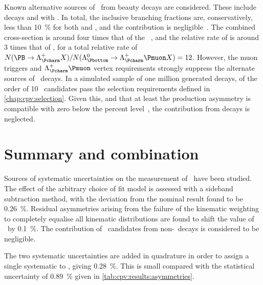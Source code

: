 Known alternative sources of \PLambdac\ from beauty decays are considered.
These include \decay{\PBplus}{\APLambdac\Pproton\Ppiplus} decays and
\decay{\PBplus}{\APSigmac\Pproton\Ppi\Ppi} with 
\decay{\PSigmac}{\PLambdac\Ppi}.
In total, the inclusive  branching fractions are, 
conservatively, less than \SI{10}{\percent} for both \PBplus and \PBzero, and 
the \PBs contribution is negligible~\cite{PDG2014}.
The combined \PB cross-section is around four times that of the 
\PLambdab~\cite{LHCb-PAPER-2013-004,Aaij:2015fea}, and the relative rate of 
 is around 3 times that of \LbToLcmuX, for a total 
relative rate of $N(\decay{\PB}{\PLambdac X})/N(\LbToLcmuX) = 12$.
However, the muon triggers and $\PLambdac\Pmuon$ vertex requirements strongly 
suppress the alternate sources of \PLambdac\ decays.
In a simulated sample of one million generated 
\decay{\PBzero}{\APLambdac\Pproton\Ppiminus\Ppiplus} decays, of the order of 10 
\PLambdac\ candidates pass the selection requirements defined in 
\cref{chap:cpv:selection}.
Given this, and that at least the \PBzero production asymmetry is compatible 
with zero below the percent level~\cite{Aaij:2014bba}, the contribution from 
\PB decays is neglected.

\section{Summary and combination}
\label{chap:cpv:syst:summary}

Sources of systematic uncertainties on the measurement of \dACP\ have been 
studied.
The effect of the arbitrary choice of fit model is assessed with a sideband 
subtraction method, with the deviation from the nominal result found to be 
\SI{0.26}{\percent}.
Residual asymmetries arising from the failure of the kinematic weighting to 
completely equalise all kinematic distributions are found to shift the value of 
\dACP\ by \SI{0.1}{\percent}.
The contribution of \PLambdac\ candidates from non-\PLambdab\ decays is 
considered to be negligible.

The two systematic uncertainties are added in quadrature in order to assign a 
single systematic to \dACP, giving \SI{0.28}{\percent}.
This is small compared with the statistical uncertainty of \SI{0.89}{\percent} 
given in \cref{tab:cpv:results:asymmetries}.
